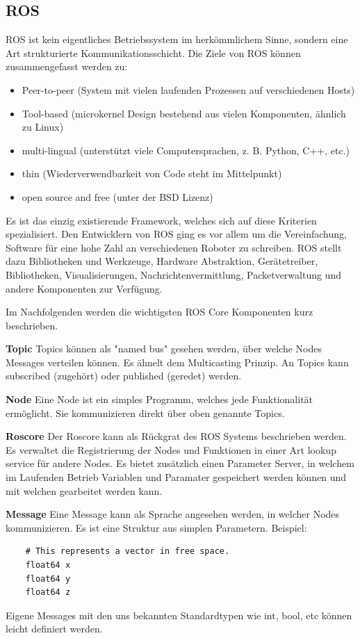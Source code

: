 \documentclass[12pt]{article}
\begin{document}
\subsection{ROS}
ROS ist kein eigentliches Betriebssystem im herkömmlichem Sinne, sondern eine Art strukturierte Kommunikationsschicht.
Die Ziele von ROS können zusammengefasst werden zu:
\begin{itemize}
\item Peer-to-peer (System mit vielen laufenden Prozessen auf verschiedenen Hosts)
\item Tool-based (microkernel Design bestehend aus vielen Komponenten, ähnlich zu Linux)
\item multi-lingual (unterstützt viele Computersprachen, z. B. Python, C++, etc.)
\item thin (Wiederverwendbarkeit von Code steht im Mittelpunkt)
\item open source and free (unter der BSD Lizenz)
\end{itemize}
Es ist das einzig existierende Framework, welches sich auf diese Kriterien spezialisiert.
Den Entwicklern von ROS ging es vor allem um die Vereinfachung, Software für eine hohe Zahl an verschiedenen Roboter zu schreiben.
ROS stellt dazu Bibliotheken und Werkzeuge, Hardware Abstraktion, Gerätetreiber, Bibliotheken, Visualisierungen, Nachrichtenvermittlung, Packetverwaltung und andere Komponenten zur Verfügung.

Im Nachfolgenden werden die wichtigsten ROS Core Komponenten kurz beschrieben.

{\bf Topic} Topics können als "named bus" gesehen werden, über welche Nodes Messages verteilen können. Es ähnelt dem Multicasting Prinzip. An Topics kann subscribed (zugehört) oder published (geredet) werden.

{\bf Node} Eine Node ist ein simples Programm, welches jede Funktionalität ermöglicht.  Sie kommunizieren direkt über oben genannte Topics.

{\bf Roscore} Der Roscore kann als Rückgrat des ROS Systems beschrieben werden. Es verwaltet die Registrierung der Nodes und Funktionen in einer Art lookup service für andere Nodes. Es bietet zusätzlich einen Parameter Server, in welchem im Laufenden Betrieb Variablen und Paramater gespeichert werden können und mit welchen gearbeitet werden kann.

{\bf Message} Eine Message kann als Sprache angesehen werden, in welcher Nodes kommunizieren. Es ist eine Struktur aus simplen Parametern.
Beispiel:
\begin{verbatim}
	# This represents a vector in free space. 
	float64 x
	float64 y
	float64 z
\end{verbatim}
Eigene Messages mit den uns bekannten Standardtypen wie int, bool, etc können leicht definiert werden.
\end{document}
